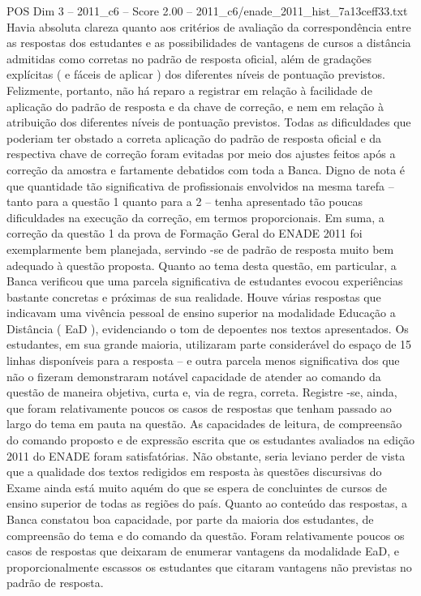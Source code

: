 \begin{textsample}{POS Dim 3 – 2011\_c6 – Score 2.00 – 2011\_c6/enade\_2011\_hist\_7a13ceff33.txt}
Havia absoluta clareza quanto aos critérios de avaliação da correspondência entre as respostas dos estudantes e as possibilidades de vantagens de cursos a distância admitidas como corretas no padrão de resposta oficial, além de gradações explícitas ( e fáceis de aplicar ) dos diferentes níveis de pontuação previstos.
Felizmente, portanto, não há reparo a registrar em relação à facilidade de aplicação do padrão de resposta e da chave de correção, e nem em relação à atribuição dos diferentes níveis de pontuação previstos.
Todas as dificuldades que poderiam ter obstado a correta aplicação do padrão de resposta oficial e da respectiva chave de correção foram evitadas por meio dos ajustes feitos após a correção da amostra e fartamente debatidos com toda a Banca.
Digno de nota é que quantidade tão significativa de profissionais envolvidos na mesma tarefa – tanto para a questão 1 quanto para a 2 – tenha apresentado tão poucas dificuldades na execução da correção, em termos proporcionais.
Em suma, a correção da questão 1 da prova de Formação Geral do ENADE 2011 foi exemplarmente bem planejada, servindo -se de padrão de resposta muito bem adequado à questão proposta.
Quanto ao tema desta questão, em particular, a Banca verificou que uma parcela significativa de estudantes evocou experiências bastante concretas e próximas de sua realidade.
Houve várias respostas que indicavam uma vivência pessoal de ensino superior na modalidade Educação a Distância ( EaD ), evidenciando o tom de depoentes nos textos apresentados.
Os estudantes, em sua grande maioria, utilizaram parte considerável do espaço de 15 linhas disponíveis para a resposta – e outra parcela menos significativa dos que não o fizeram demonstraram notável capacidade de atender ao comando da questão de maneira objetiva, curta e, via de regra, correta.
Registre -se, ainda, que foram relativamente poucos os casos de respostas que tenham passado ao largo do tema em pauta na questão.
As capacidades de leitura, de compreensão do comando proposto e de expressão escrita que os estudantes avaliados na edição 2011 do ENADE foram satisfatórias.
Não obstante, seria leviano perder de vista que a qualidade dos textos redigidos em resposta às questões discursivas do Exame ainda está muito aquém do que se espera de concluintes de cursos de ensino superior de todas as regiões do país.
Quanto ao conteúdo das respostas, a Banca constatou boa capacidade, por parte da maioria dos estudantes, de compreensão do tema e do comando da questão.
Foram relativamente poucos os casos de respostas que deixaram de enumerar vantagens da modalidade EaD, e proporcionalmente escassos os estudantes que citaram vantagens não previstas no padrão de resposta.

\end{textsample}
